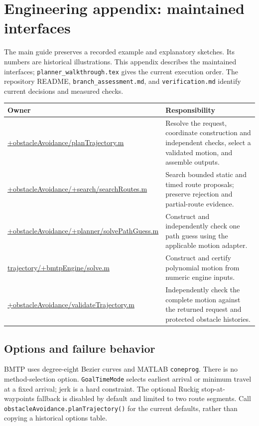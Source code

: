 \appendix
\section{Engineering appendix: maintained interfaces}

The main guide preserves a recorded example and explanatory sketches. Its
numbers are historical illustrations. This appendix describes the maintained
interfaces; \texttt{planner\_walkthrough.tex} gives the current execution order.
The repository README, \texttt{branch\_assessment.md}, and
\texttt{verification.md} identify current decisions and measured checks.

\begin{tabularx}{\textwidth}{p{}X}
\toprule
Owner & Responsibility \\
\midrule
\scriptsize\url{+obstacleAvoidance/planTrajectory.m} & Resolve the request, coordinate construction and independent checks, select a validated motion, and assemble outputs. \\
\scriptsize\url{+obstacleAvoidance/+search/searchRoutes.m} & Search bounded static and timed route proposals; preserve rejection and partial-route evidence. \\
\scriptsize\url{+obstacleAvoidance/+planner/solvePathGuess.m} & Construct and independently check one path guess using the applicable motion adapter. \\
\scriptsize\url{trajectory/+bmtpEngine/solve.m} & Construct and certify polynomial motion from numeric engine inputs. \\
\scriptsize\url{+obstacleAvoidance/validateTrajectory.m} & Independently check the complete motion against the returned request and protected obstacle histories. \\
\bottomrule
\end{tabularx}

\subsection{Options and failure behavior}

BMTP uses degree-eight Bezier curves and MATLAB \texttt{coneprog}.
There is no method-selection option. \texttt{GoalTimeMode} selects earliest
arrival or minimum travel at a fixed arrival; jerk is a hard constraint.
The optional Ruckig stop-at-waypoints fallback is disabled by default and limited
to two route segments. Call \texttt{obstacleAvoidance.planTrajectory()} for the
current defaults, rather than copying a historical options table.

